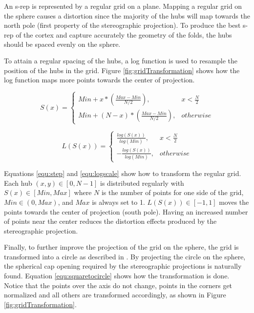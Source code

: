 An s-rep is represented by a regular grid on a plane.
Mapping a regular grid on the sphere 
causes a distortion since 
the majority of the hubs will map towards the north pole (first property of the stereographic projection).
To produce the best s-rep of the cortex and capture accurately the geometry of the folds,
the hubs should be spaced evenly on the sphere. 

To attain a regular spacing of the hubs, a log function is used to resample the position of the hubs in the grid. 
Figure \ref{fig:gridTransformation} shows how the log function maps more points towards the center of projection.

\begin{equation}
  S(x) =  \left\{
		  \begin{array}{lr}
			  Min + x*(\frac{Max - Min}{N/2}), & x < \frac{N}{2} \\
			  Min + (N-x)*(\frac{Max - Min}{N/2}), & otherwise
		  \end{array}
  \right.  
  \label{equ:step}
\end{equation}

\begin{equation} 
 L(S(x)) = \left\{\begin{array}{lr}
			  \frac{log(S(x))}{log(Min)}, & x < \frac{N}{2} \\
			  -\frac{log(S(x))}{log(Min)}, & otherwise
		  \end{array}
		  \right.
  \label{equ:logscale}
\end{equation}

Equations \ref{equ:step} and \ref{equ:logscale} show how to transform the regular grid.
Each hub $(x,y) \in [0, N-1]$ is distributed regularly with $S(x) \in [Min, Max]$
where $N$ is the number of points for one side of the grid,
$Min \in (0, Max)$, and $Max$ is always set to 1.
$L(S(x)) \in [-1, 1]$ moves the points towards the center 
of projection (south pole). Having an increased number of 
points near the center reduces the distortion effects 
produced by the stereographic projection.

Finally, to further improve the projection of the grid on the sphere, 
the grid is transformed
into a circle as described in \cite{nowell_philip_math}.
By projecting the circle on the sphere, the spherical cap opening
required by the stereographic projections is naturally found.
Equation \ref{equ:squaretocircle} shows how the transformation is done. 
Notice that the points over the axis do not change, points in the corners get normalized and all others are 
transformed accordingly, as shown in Figure \ref{fig:gridTransformation}.

